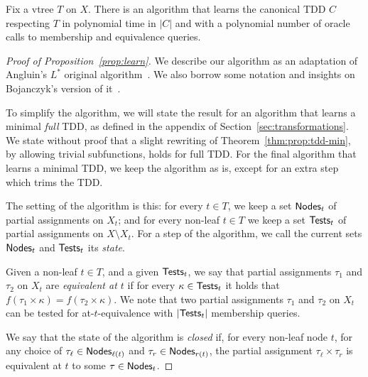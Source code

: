 \begin{proposition}[$\star$]  \label{prop:learn}
Fix a vtree $T$ on $X$.
	There is an algorithm that learns the canonical TDD $C$ respecting $T$ in polynomial time in $|C|$ and with a polynomial number of oracle calls to membership and equivalence queries.
\end{proposition}
\begin{toappendix}
\begin{proof}[Proof of Proposition~\ref{prop:learn}]
We describe our algorithm as an adaptation of Angluin's $L^*$ original algorithm~\cite{angluin1987learning}.
We also borrow some notation and insights on Bojanczyk's version of it~\cite{bojanczyk}.

To simplify the algorithm, we will state the result for an algorithm that learns a minimal {\em full} TDD, as defined in the appendix of Section~\ref{sec:transformations}. We state without proof that a slight rewriting of Theorem~\ref{thm:prop:tdd-min}, by allowing trivial subfunctions, holds for full TDD.
For the final algorithm that learns a minimal TDD, we keep the algorithm as is, except for an extra step which trims the TDD.

The setting of the algorithm is this:
for every $t\in T$, we keep a set ${\sf Nodes}_t$ of partial assignments on $X_t$; and for every non-leaf $t\in T$ we keep a set ${\sf Tests}_t$ of partial assignments on $X\setminus X_t$. 
For a step of the algorithm, we call the current sets ${\sf Nodes}_t$ and ${\sf Tests}_t$ its {\em state}.

Given a non-leaf $t\in T$, and a given ${\sf Tests}_t$,  we say that partial assignments $\tau_1$ and $\tau_2$ on $X_t$ are {\em equivalent at $t$} if for every $\kappa\in {\sf Tests}_t$ it holds that $f(\tau_1 \times \kappa) = f(\tau_2 \times \kappa)$.
We note that two partial assignments $\tau_1$ and $\tau_2$ on $X_t$ can be tested for at-$t$-equivalence with $|{\sf Tests}_t|$ membership queries.

We say that the state of the algorithm is {\em closed} if, for every non-leaf node $t$, for any choice of $\tau_{\ell} \in {\sf Nodes}_{\ell(t)}$ and $\tau_r \in {\sf Nodes}_{r(t)}$, the partial assignment $\tau_\ell \times \tau_r$ is equivalent at $t$ to some $\tau \in {\sf Nodes}_t$. 


\end{proof}
\end{toappendix}
